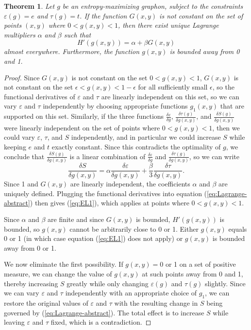 \documentclass[12pt]{amsart}
\newtheorem{theorem}[lemma]{Theorem}
\newcommand\be{\begin{equation}}
\newcommand\ee{\end{equation}}
\newcommand{\tdens}{\tau}
\newcommand{\edens}{\varepsilon}
\begin{document}
{\begin{theorem} \label{thm:Lagrange} 
Let $g$ be an entropy-maximizing graphon, subject to the constraints $\edens(g)=e$ and $\tdens(g)=t$.
If the function $G(x,y)$ is not constant on the set of points $(x,y)$ where 
$0 < g(x,y) < 1$, then there exist unique Lagrange multipliers $\alpha$ and $\beta$ such that 
\be \label{eq:EL1} H'(g(x,y)) = \alpha + \beta G(x,y) \ee
almost everywhere. Furthermore, the function $g(x,y)$ is bounded away from 0 and 1. 
\end{theorem}

\begin{proof} 
Since $G(x,y)$ is not constant on the set $0<g(x,y)<1$, $G(x,y)$ is not constant  on the set $\epsilon < g(x,y) < 1-\epsilon$ for all sufficiently small $\epsilon$, so the functional derivatives of $\edens$ and $\tdens$ are 
linearly independent on this set, so 
we can vary $\edens$ and $\tdens$ independently by choosing appropriate functions $g_1(x,y)$ that are supported 
on this set. Similarly, if the three functions $\frac{\delta \edens}{\delta g}$, $\frac{\delta \tdens(g)}{\delta g(x,y)}$, and $ \frac{\delta S(g)}{\delta g(x,y)}$ were linearly independent on the set of points where $0<g(x,y)<1$, then we could vary $\edens$, $\tdens$,
and $S$ independently, and in particular we could increase $S$ while keeping $e$ and $t$ exactly constant. Since this
contradicts the optimality of $g$, we conclude that $ \frac{\delta S(g)}{\delta g(x,y)}$ is a linear combination of 
$\frac{\delta \edens}{\delta g}$ and $\frac{\delta \tdens(g)}{\delta g(x,y)}$, so we can write
\be \label{eq:Lagrange-abstract} 
\frac{\delta S}{\delta g(x,y)} = \alpha \frac{\delta \edens}{\delta g(x,y)} + \frac{\beta}{3} \frac{\delta \tdens}
{\delta g(x,y)}. \ee
Since 1 and $G(x,y)$ are linearly independent, the coefficients $\alpha$ and $\beta$ are uniquely defined. 
Plugging the functional derivatives into equation (\ref{eq:Lagrange-abstract}) then gives (\ref{eq:EL1}),
which applies at points where $0<g(x,y)<1$. 

Since $\alpha$ and $\beta$ are finite and since $G(x,y)$ is bounded, $H'(g(x,y))$ is bounded, so $g(x,y)$ cannot be 
arbitrarily close to 0 or 1. Either $g(x,y)$ equals 0 or 1 (in which case equation (\ref{eq:EL1}) does not apply) or 
$g(x,y)$ is bounded away from 0 or 1. 

We now eliminate the first possibility. If $g(x,y)=0$ or 1 on a set of positive measure, we can change the value of 
$g(x,y)$ at such points away from 0 and 1, thereby increasing $S$ greatly while only changing $\edens(g)$ and $\tdens(g)$
slightly. Since we can vary $\edens$ and $\tdens$ independently with an appropriate choice of $g_1$, we can restore
the original values of $\edens$ and $\tdens$ with the resulting change in $S$ being governed by (\ref{eq:Lagrange-abstract}).
The total effect is to increase $S$ while leaving $\edens$ and $\tdens$ fixed, which is a contradiction. 
\end{proof} 

}
\end{document}
